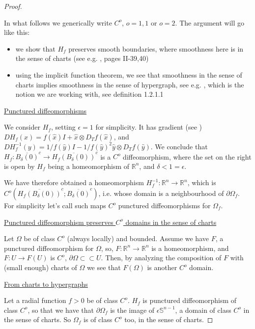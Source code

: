 \documentclass[english,a4paper,9pt,oneside]{scrbook}	%
\theoremstyle{break}
\newenvironment{mproof}[1][\proofname]{%
  \begin{proof}[#1]$ $\par\nobreak\ignorespaces
}{%
  \end{proof}
}
\renewcommand*{\proofname}{Proof}
\theoremstyle{remark}
\newcommand{\mR}{\mathbb{R}}
\newcommand{\mS}{\mathbb{S}^{n-1}}
\newcommand{\cc}{\subset\subset}
\newcommand{\xh}{\hat{x}}
\newcommand{\yh}{\hat{y}}
\newcommand{\eps}{\epsilon}
\begin{document}
\begin{mproof}

In what follows we generically write $ C^o$, $o=1,1 $ or $o=2$. The argument will go like this:

\begin{itemize}
	\item we show that $H_f$ preserves smooth boundaries, where smoothness here is in the sense of charts (see e.g. \cite{murat}, pages II-39,40)
	\item using the implicit function theorem, we see that smoothness in the sense of charts implies smoothness in the sense of hypergraph, see e.g. \cite{grisvard}, which is the notion we are working with, see definition 1.2.1.1 
\end{itemize}


\underline{Punctured diffeomorphisms}

We consider $H_f$, setting $\eps=1$ for simplicity. It has gradient (see \cite{deckelnick}) $D H_f(x) = f(\xh)I+\xh \otimes D_Tf(\xh)$, and  $D H_f^{-1}(y) =1/f(\yh)I-1/f(\yh)^2 \yh \otimes D_Tf(\yh)$. We conclude that $H_f: \overline{B_\delta(0)}^c \rightarrow \overline{H_f(B_\delta(0))}^c$ is a $C^o$ diffeomorphism, where the set on the right is open by $H_f$ being a homeomorphism of $\mR^n$, and $\delta < 1 = \eps$.

We have therefore obtained a homeomorphism $H_f^{-1}:\mR^n \rightarrow \mR^n$, which is $C^o( \overline{H_f(B_\delta(0))}^c;\overline{B_\delta(0)}^c )$, i.e. whose domain is a neighbourhood of $\partial \Omega_f$.
For simplicity let's call such maps $C^o$ punctured diffeomorphisms for $\Omega_f$.

\underline{Punctured diffeomorphism preserves $C^o$ domains in the sense of charts}

Let $\Omega$ be of class $C^o$ (always locally) and bounded. Assume we have $F$, a punctured diffeomorphism for $\Omega$, so, $F:\mR^n\rightarrow \mR^n$ is a homeomorphism, and $F: U\rightarrow F(U)$ is $C^o$, $\partial \Omega \cc U$. Then, by analyzing the composition of $F$ with (small enough) charts of $\Omega$ we see that $F(\Omega)$ is another $C^o$ domain. 

\underline{From charts to hypergraphs}

Let a radial function $f>0$ be of class $C^o$. $H_f$ is punctured diffeomorphism of class $C^o$, so that we have that $\partial \Omega_f$ is the image of $\eps\mS$, a domain of class $C^o$ in the sense of charts. So $\Omega_f $ is of class $C^o$ too, in the sense of charts.



\end{mproof}
\end{document}
